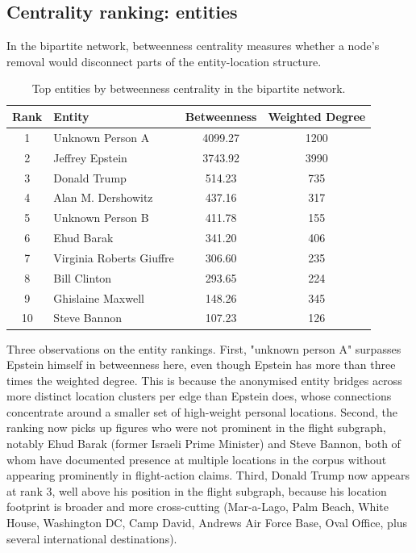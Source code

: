 \subsection{Centrality ranking: entities}
In the bipartite network, betweenness centrality measures whether a node's removal would disconnect parts of the entity-location structure.
\begin{table}[H]
    \centering
    \begin{tabular}{c l c c}
        \toprule
        Rank & Entity & Betweenness & Weighted Degree \\
        \midrule
            1 & Unknown Person A & 4099.27 & 1200 \\
            2 & Jeffrey Epstein & 3743.92 & 3990 \\
            3 & Donald Trump & 514.23 & 735 \\
            4 & Alan M. Dershowitz & 437.16 & 317 \\
            5 & Unknown Person B & 411.78 & 155 \\
            6 & Ehud Barak & 341.20 & 406 \\
            7 & Virginia Roberts Giuffre & 306.60 & 235 \\
            8 & Bill Clinton & 293.65 & 224 \\
            9 & Ghislaine Maxwell & 148.26 & 345 \\
            10 & Steve Bannon & 107.23 & 126 \\
        \bottomrule
    \end{tabular}
    \caption{Top entities by betweenness centrality in the bipartite network.}
    \label{tab:bipartite_entities}
\end{table}
Three observations on the entity rankings. First, "unknown person A" surpasses Epstein himself in betweenness here, even though Epstein has more than three times the weighted degree. This is because the anonymised entity bridges across more distinct location clusters per edge than Epstein does, whose connections concentrate around a smaller set of high-weight personal locations. Second, the ranking now picks up figures who were not prominent in the flight subgraph, notably Ehud Barak (former Israeli Prime Minister) and Steve Bannon, both of whom have documented presence at multiple locations in the corpus without appearing prominently in flight-action claims. Third, Donald Trump now appears at rank 3, well above his position in the flight subgraph, because his location footprint is broader and more cross-cutting (Mar-a-Lago, Palm Beach, White House, Washington DC, Camp David, Andrews Air Force Base, Oval Office, plus several international destinations).

